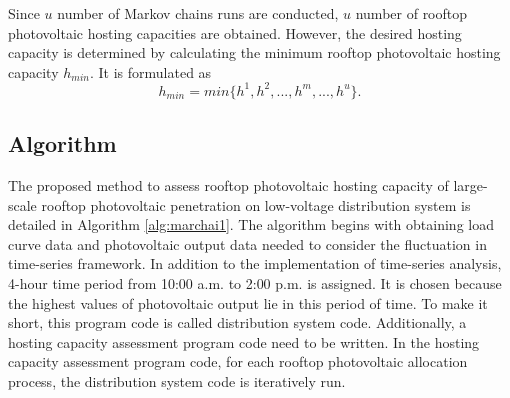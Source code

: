 Since $u$ number of Markov chains runs are conducted, $u$ number of rooftop photovoltaic hosting capacities are obtained. However, the desired hosting capacity is determined by calculating the minimum rooftop photovoltaic hosting capacity $\mathit{h_{min}}$. It is formulated as
\begin{equation}\label{phc2}
\mathit{h_{min}}=min\{h^1,h^2,...,h^m,...,h^u\}.
\end{equation}
\subsection{Algorithm}
The proposed method to assess rooftop photovoltaic hosting capacity of large-scale rooftop photovoltaic penetration on low-voltage distribution system is detailed in Algorithm \ref{alg:marchai1}. The algorithm begins with obtaining load curve data and photovoltaic output data needed to consider the fluctuation in time-series framework. In addition to the implementation of time-series analysis, 4-hour time period from 10:00 a.m. to 2:00 p.m. is assigned. It is chosen because the highest values of photovoltaic output lie in this period of time. To make it short, this program code is called distribution system code. Additionally, a hosting capacity assessment program code need to be written. In the hosting capacity assessment program code, for each rooftop photovoltaic allocation process, the distribution system code is iteratively run.

